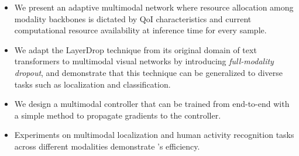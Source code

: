 \begin{itemize}[leftmargin=*,align=left]

    \item We present an adaptive multimodal network where resource allocation among modality backbones is dictated by QoI characteristics and current computational resource availability at inference time for every sample.
    
    \item We adapt the LayerDrop technique from its original domain of text transformers to multimodal visual networks by introducing \emph{full-modality dropout}, and demonstrate that this technique can be generalized to diverse tasks such as localization and classification.
    
    \item We design a multimodal controller that can be trained from end-to-end with a simple method to propagate gradients to the controller.


\item Experiments on multimodal localization and human activity recognition tasks across different modalities demonstrate \name's efficiency.


\end{itemize}







